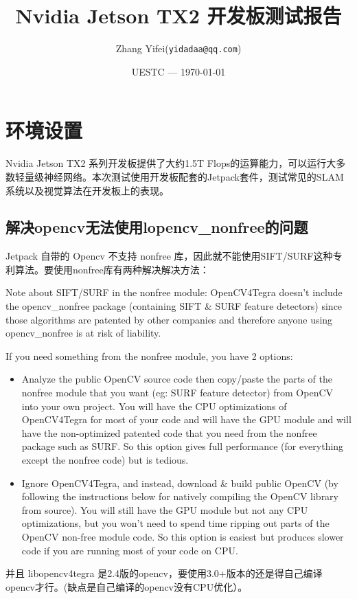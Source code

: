 \documentclass{article}
\title{Nvidia Jetson TX2 开发板测试报告}
\author{Zhang Yifei(\texttt{yidadaa@qq.com})}
\date{UESTC --- \today}
\begin{document}
\maketitle

\section{环境设置}
Nvidia Jetson TX2 系列开发板提供了大约1.5T Flops的运算能力，可以运行大多数轻量级神经网络。本次测试使用开发板配套的Jetpack套件，测试常见的SLAM系统以及视觉算法在开发板上的表现。
\subsection{解决opencv无法使用\-lopencv\_nonfree的问题}
Jetpack 自带的 Opencv 不支持 nonfree 库，因此就不能使用SIFT/SURF这种专利算法。要使用nonfree库有两种解决解决方法：

Note about SIFT/SURF in the nonfree module: OpenCV4Tegra doesn’t include the opencv\_nonfree package (containing SIFT \& SURF feature detectors) since those algorithms are patented by other companies and therefore anyone using opencv\_nonfree is at risk of liability.

If you need something from the nonfree module, you have 2 options:

\begin{itemize}
    \item Analyze the public OpenCV source code then copy/paste the parts of the nonfree module that you want (eg: SURF feature detector) from OpenCV into your own project. You will have the CPU optimizations of OpenCV4Tegra for most of your code and will have the GPU module and will have the non-optimized patented code that you need from the nonfree package such as SURF. So this option gives full performance (for everything except the nonfree code) but is tedious.
    \item Ignore OpenCV4Tegra, and instead, download \& build public OpenCV (by following the instructions below for natively compiling the OpenCV library from source). You will still have the GPU module but not any CPU optimizations, but you won’t need to spend time ripping out parts of the OpenCV non-free module code. So this option is easiest but produces slower code if you are running most of your code on CPU.
\end{itemize}

并且 libopencv4tegra 是2.4版的opencv，要使用3.0+版本的还是得自己编译opencv才行。(缺点是自己编译的opencv没有CPU优化）。
\end{document}
